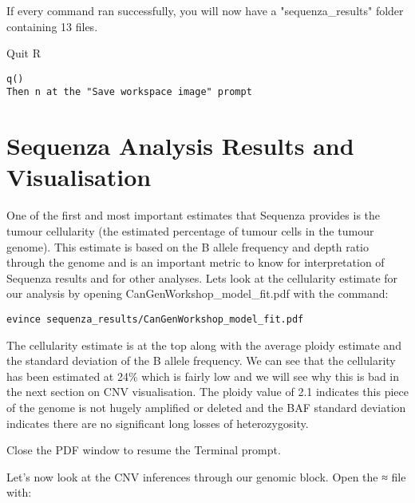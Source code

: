 If every command ran successfully, you will now have a "sequenza\_results" folder containing 13 files.

\begin{steps}
Quit R
\begin{lstlisting}
q()
Then n at the "Save workspace image" prompt
\end{lstlisting}
\end{steps}


\newpage


\section{Sequenza Analysis Results and Visualisation}

One of the first and most important estimates that Sequenza provides is the tumour cellularity (the estimated percentage of tumour cells in the tumour genome). This estimate is based on the B allele frequency and depth ratio through the genome and is an important metric to know for interpretation of Sequenza results and for other analyses. Lets look at the cellularity estimate for our analysis by opening CanGenWorkshop\_model\_fit.pdf with the command:

\begin{steps}
\begin{lstlisting}
evince sequenza_results/CanGenWorkshop_model_fit.pdf
\end{lstlisting}
\end{steps}

The cellularity estimate is at the top along with the average ploidy estimate and the standard deviation of the B allele frequency. We can see that the cellularity has been estimated at 24\% which is fairly low and we will see why this is bad in the next section on CNV visualisation. The ploidy value of 2.1 indicates this piece of the genome is not hugely amplified or deleted and the BAF standard deviation indicates there are no significant long losses of heterozygosity.

Close the PDF window to resume the Terminal prompt.

Let's now look at the CNV inferences through our genomic block. Open the ≈ file with:

